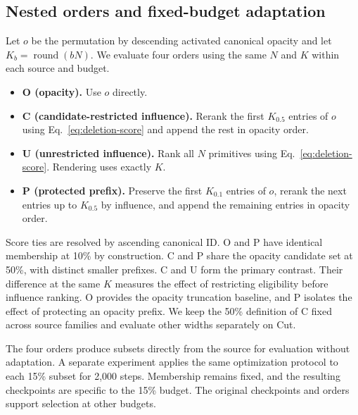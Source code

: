 \documentclass[pdflatex,sn-mathphys]{sn-jnl}
\begin{document}
\subsection{Nested orders and fixed-budget adaptation}
Let $o$ be the permutation by descending activated canonical opacity and let $K_b=\operatorname{round}(bN)$. We evaluate four orders using the same $N$ and $K$ within each source and budget.
\begin{itemize}
\item \textbf{O (opacity).} Use $o$ directly.
\item \textbf{C (candidate-restricted influence).} Rerank the first $K_{0.5}$ entries of $o$ using Eq.~\eqref{eq:deletion-score} and append the rest in opacity order.
\item \textbf{U (unrestricted influence).} Rank all $N$ primitives using Eq.~\eqref{eq:deletion-score}. Rendering uses exactly $K$.
\item \textbf{P (protected prefix).} Preserve the first $K_{0.1}$ entries of $o$, rerank the next entries up to $K_{0.5}$ by influence, and append the remaining entries in opacity order.
\end{itemize}
Score ties are resolved by ascending canonical ID. O and P have identical membership at 10\% by construction. C and P share the opacity candidate set at 50\%, with distinct smaller prefixes. C and U form the primary contrast. Their difference at the same $K$ measures the effect of restricting eligibility before influence ranking. O provides the opacity truncation baseline, and P isolates the effect of protecting an opacity prefix. We keep the 50\% definition of C fixed across source families and evaluate other widths separately on Cut.

The four orders produce subsets directly from the source for evaluation without adaptation. A separate experiment applies the same optimization protocol to each 15\% subset for 2,000 steps. Membership remains fixed, and the resulting checkpoints are specific to the 15\% budget. The original checkpoints and orders support selection at other budgets.


\end{document}
